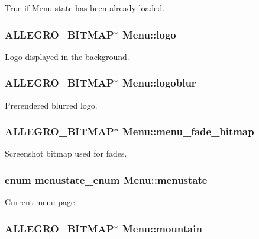 True if \hyperlink{structMenu}{Menu} state has been already loaded. \hypertarget{structMenu_a57c99e96f0ea7d38a359748533cc0124}{
\subsubsection[{logo}]{\setlength{\rightskip}{0pt plus 5cm}A\-L\-L\-E\-G\-R\-O\-\_\-\-B\-I\-T\-M\-A\-P$\ast$ Menu\-::logo}}\label{structMenu_a57c99e96f0ea7d38a359748533cc0124}
Logo displayed in the background. \hypertarget{structMenu_a5f788b05a06fb2322c790e178c34bad6}{
\subsubsection[{logoblur}]{\setlength{\rightskip}{0pt plus 5cm}A\-L\-L\-E\-G\-R\-O\-\_\-\-B\-I\-T\-M\-A\-P$\ast$ Menu\-::logoblur}}\label{structMenu_a5f788b05a06fb2322c790e178c34bad6}
Prerendered blurred logo. \hypertarget{structMenu_a4d3a2c17b2882c7adf10a15ba49932b4}{
\subsubsection[{menu\-\_\-fade\-\_\-bitmap}]{\setlength{\rightskip}{0pt plus 5cm}A\-L\-L\-E\-G\-R\-O\-\_\-\-B\-I\-T\-M\-A\-P$\ast$ Menu\-::menu\-\_\-fade\-\_\-bitmap}}\label{structMenu_a4d3a2c17b2882c7adf10a15ba49932b4}
Screenshot bitmap used for fades. \hypertarget{structMenu_a6c264952ac073cf2f290de86a677c876}{
\subsubsection[{menustate}]{\setlength{\rightskip}{0pt plus 5cm}enum {\bf menustate\-\_\-enum} Menu\-::menustate}}\label{structMenu_a6c264952ac073cf2f290de86a677c876}
Current menu page. \hypertarget{structMenu_a3a957c0b3a961e3c2be9001c15e82208}{
\subsubsection[{mountain}]{\setlength{\rightskip}{0pt plus 5cm}A\-L\-L\-E\-G\-R\-O\-\_\-\-B\-I\-T\-M\-A\-P$\ast$ Menu\-::mountain}}\label{structMenu_a3a957c0b3a961e3c2be9001c15e82208}
